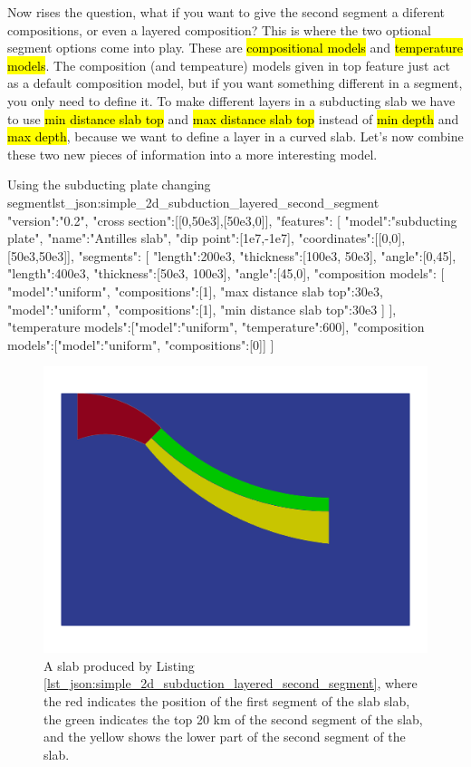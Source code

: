 \documentclass{book}
\begin{document}
Now rises the question, what if you want to give the second segment a diferent compositions, or even a layered composition? This is where the two optional segment options come into play. These are \hl{compositional models} and \hl{temperature models}. The composition (and tempeature) models given in top feature just act as a default composition model, but if you want something different in a segment, you only need to define it. To make different layers in a subducting slab we have to use \hl{min distance slab top} and \hl{max distance slab top} instead of \hl{min depth} and \hl{max depth}, because we want to define a layer in a curved slab. Let's now combine these two new pieces of information into a more interesting model.

\begin{javascriptcode}{Using the subducting plate changing segment}{lst_json:simple_2d_subduction_layered_second_segment}
{
  "version":"0.2",
  "cross section":[[0,50e3],[50e3,0]],
  "features":
  [
     {
       "model":"subducting plate", "name":"Antilles slab", "dip point":[1e7,-1e7],
       "coordinates":[[0,0],[50e3,50e3]], 
       "segments":
       [
         {"length":200e3, "thickness":[100e3, 50e3], "angle":[0,45]},
         {
           "length":400e3, "thickness":[50e3, 100e3], "angle":[45,0],
           "composition models":
           [
             {"model":"uniform", "compositions":[1], "max distance slab top":30e3},
             {"model":"uniform", "compositions":[1], "min distance slab top":30e3}
           ]
         }
       ],
       "temperature models":[{"model":"uniform", "temperature":600}],
       "composition models":[{"model":"uniform", "compositions":[0]}]
    }
  ]
}
\end{javascriptcode}


\begin{figure}
    \centering
    \includegraphics{simple_subducting_plate_example_segments.png}
    \caption{A slab produced by Listing \ref{lst_json:simple_2d_subduction_layered_second_segment}, where the red indicates the position of the first segment of the slab slab, the green indicates the top 20 km of the second segment of the slab, and the yellow shows the lower part of the second segment of the slab.}
    \label{fig:simple_2d_subduction}
\end{figure}
\end{document}
